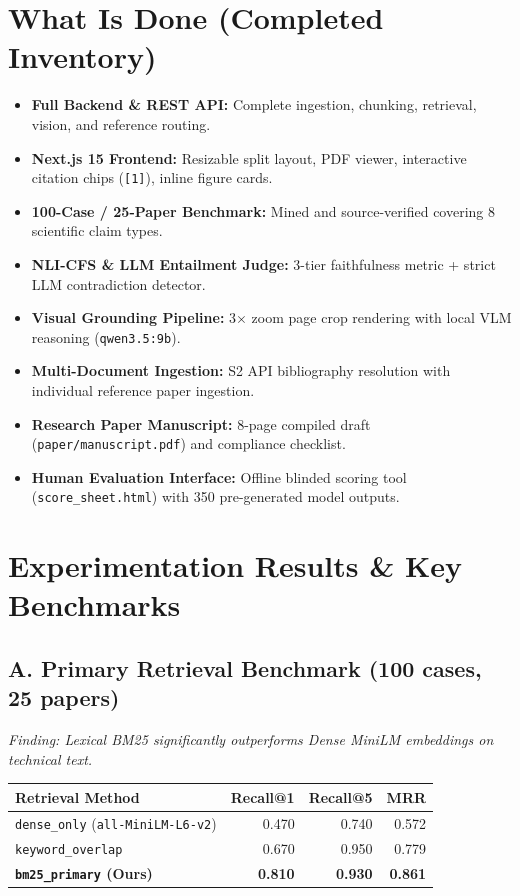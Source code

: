 \documentclass[10pt,a4paper]{article}
\begin{document}
\section{What Is Done (Completed Inventory)}

\begin{itemize}[leftmargin=1.5em, itemsep=2pt]
    \item[$\boxtimes$] \textbf{Full Backend \& REST API:} Complete ingestion, chunking, retrieval, vision, and reference routing.
    \item[$\boxtimes$] \textbf{Next.js 15 Frontend:} Resizable split layout, PDF viewer, interactive citation chips (\texttt{[1]}), inline figure cards.
    \item[$\boxtimes$] \textbf{100-Case / 25-Paper Benchmark:} Mined and source-verified covering 8 scientific claim types.
    \item[$\boxtimes$] \textbf{NLI-CFS \& LLM Entailment Judge:} 3-tier faithfulness metric + strict LLM contradiction detector.
    \item[$\boxtimes$] \textbf{Visual Grounding Pipeline:} 3$\times$ zoom page crop rendering with local VLM reasoning (\texttt{qwen3.5:9b}).
    \item[$\boxtimes$] \textbf{Multi-Document Ingestion:} S2 API bibliography resolution with individual reference paper ingestion.
    \item[$\boxtimes$] \textbf{Research Paper Manuscript:} 8-page compiled draft (\texttt{paper/manuscript.pdf}) and compliance checklist.
    \item[$\boxtimes$] \textbf{Human Evaluation Interface:} Offline blinded scoring tool (\texttt{score\_sheet.html}) with 350 pre-generated model outputs.
\end{itemize}

\section{Experimentation Results \& Key Benchmarks}

\subsection{A. Primary Retrieval Benchmark (100 cases, 25 papers)}
\textit{Finding: Lexical BM25 significantly outperforms Dense MiniLM embeddings on technical text.}

\begin{table}[h!]
\centering
\small
\begin{tabularx}{0.75\textwidth}{X r r r}
\toprule
\textbf{Retrieval Method} & \textbf{Recall@1} & \textbf{Recall@5} & \textbf{MRR} \\
\midrule
\texttt{dense\_only} (\texttt{all-MiniLM-L6-v2}) & 0.470 & 0.740 & 0.572 \\
\texttt{keyword\_overlap} & 0.670 & 0.950 & 0.779 \\
\textbf{\texttt{bm25\_primary} (Ours)} & \textbf{0.810} & \textbf{0.930} & \textbf{0.861} \\
\bottomrule
\end{tabularx}
\end{table}
\end{document}

